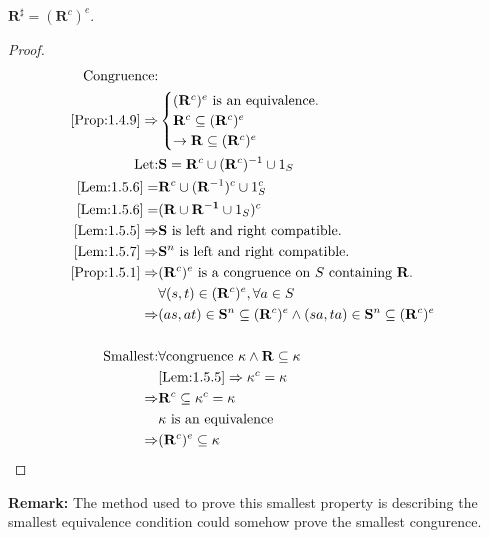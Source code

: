 \begin{Prop}\label{Prop:1.5.8}
    $\mathbf{R}^{\sharp} = (\mathbf{R}^c)^e$.

    \begin{proof}
        \begin{align*}
            \text{Congruence:}\\
            \ref{Prop:1.4.9}\Rightarrow &
            \begin{cases}
                (\mathbf{R}^c)^e \text{ is an equivalence.} \\
                \mathbf{R}^c \subseteq (\mathbf{R}^c)^e     \\
                \rightarrow \mathbf{R} \subseteq (\mathbf{R}^c)^e       \\
            \end{cases}             \\
            \text{Let:} & \mathbf{S} = \mathbf{R}^c \cup (\mathbf{R}^c)^{-1} \cup 1_S \\
            \ref{Lem:1.5.6}=& \mathbf{R}^c \cup (\mathbf{R}^{-1})^c \cup 1_S^c \\
            \ref{Lem:1.5.6}=& (\mathbf{R} \cup \mathbf{R^{-1}} \cup 1_S )^c    \\
            \ref{Lem:1.5.5}\Rightarrow & \mathbf{S} \text{ is left and right compatible.}   \\
            \ref{Lem:1.5.7} \Rightarrow & \mathbf{S}^n \text{ is left and right compatible.}    \\
            \ref{Prop:1.5.1}\Rightarrow & (\mathbf{R}^c)^e \text{ is a congruence on } S \text{ containing } \mathbf{R}.    \\
            & \forall (s,t) \in (\mathbf{R}^c)^e, \forall a \in S   \\
            \Rightarrow& (as, at) \in \mathbf{S}^n \subseteq (\mathbf{R}^c)^e \wedge (sa, ta) \in \mathbf{S}^n \subseteq (\mathbf{R}^c)^e  \\
            \\
            \text{Smallest:} & \forall \text{congruence } \kappa \wedge \mathbf{R} \subseteq \kappa \\
            & \ref{Lem:1.5.5}\Rightarrow \kappa^c = \kappa  \\
            \Rightarrow & \mathbf{R}^c \subseteq \kappa^c = \kappa  \\
            & \kappa \text{ is an equivalence}  \\
            \Rightarrow & (\mathbf{R}^c)^e \subseteq \kappa
        \end{align*}
    \end{proof}
    \textbf{Remark: }The method used to prove this smallest property is  describing the smallest equivalence condition could somehow prove the smallest congurence.
\end{Prop}


